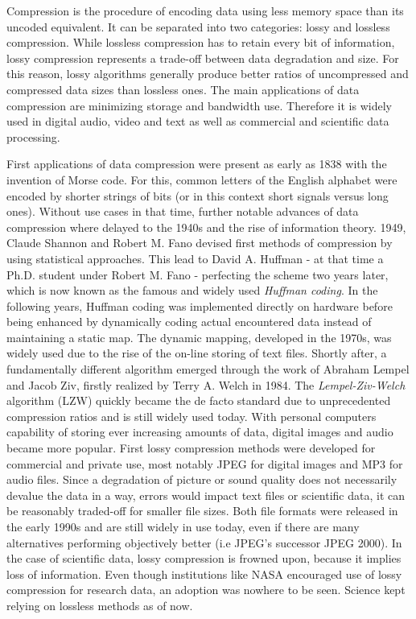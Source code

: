 \documentclass[
	12pt,
	a4paper,
	BCOR10mm,
	DIV14,
	headsepline,
]{scrreprt}
\begin{document}



Compression is the procedure of encoding data using less memory space than its uncoded equivalent.
It can be separated into two categories: lossy and lossless compression.
While lossless compression has to retain every bit of information, lossy compression represents a trade-off between data degradation and size.
For this reason, lossy algorithms generally produce better ratios of uncompressed and compressed data sizes than lossless ones.
The main applications of data compression are minimizing storage and bandwidth use.
Therefore it is widely used in digital audio, video and text as well as commercial and scientific data processing. \par

First applications of data compression were present as early as 1838 with the invention of Morse code.
For this, common letters of the English alphabet were encoded by shorter strings of bits (or in this context short signals versus long ones). %
Without use cases in that time, further notable advances of data compression where delayed to the 1940s and the rise of information theory.
1949, Claude Shannon and Robert M. Fano devised first methods of compression by using statistical approaches.
This lead to David A. Huffman - at that time a Ph.D. student under Robert M. Fano - perfecting the scheme two years later, which is now known as the famous and widely used \textit{Huffman coding}. \cite{huffenc}
In the following years, Huffman coding was implemented directly on hardware before being enhanced by dynamically coding actual encountered data instead of maintaining a static map.
The dynamic mapping, developed in the 1970s, was widely used due to the rise of the on-line storing of text files.
Shortly after, a fundamentally different algorithm emerged through the work of Abraham Lempel and Jacob Ziv, firstly realized by Terry A. Welch in 1984. \cite{welchenc}
The \textit{Lempel-Ziv-Welch} algorithm (LZW) quickly became the de facto standard due to unprecedented compression ratios and is still widely used today. \cite{llcomp}
With personal computers capability of storing ever increasing amounts of data, digital images and audio became more popular. \cite{anks}
First lossy compression methods were developed for commercial and private use, most notably JPEG for digital images and MP3 for audio files.
Since a degradation of picture or sound quality does not necessarily devalue the data in a way, errors would impact text files or scientific data, it can be reasonably traded-off for smaller file sizes.
Both file formats were released in the early 1990s and are still widely in use today, even if there are many alternatives performing objectively better (i.e JPEG's successor JPEG 2000). \cite{jpeg}
In the case of scientific data, lossy compression is frowned upon, because it implies loss of information.
Even though institutions like NASA encouraged use of lossy compression for research data, an adoption was nowhere to be seen. \cite{nasa}
Science kept relying on lossless methods as of now. \par
\end{document}
